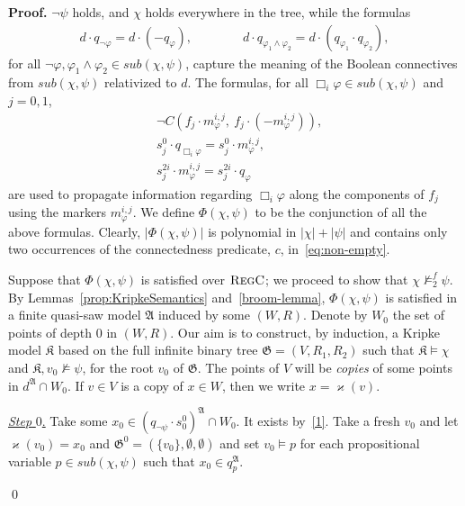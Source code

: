 \documentclass{LMCS}
\renewenvironment{proof}{\par\noindent\textbf{Proof.}}{\mbox{}\qed\par\medskip}
\theoremstyle{plain}
\newcommand{\Regc}{\textsc{RegC}}
\begin{document}
\begin{proof}
$\neg \psi$ holds,
and $\chi$ holds everywhere in the tree, while the
formulas
\begin{align}\label{2}
d \cdot q_{\neg \varphi}  = d \cdot (-q_{\varphi}),\qquad\qquad
d \cdot q_{\varphi_1 \land \varphi_2}  =  d \cdot  (q_{\varphi_1} \cdot q_{\varphi_2}),
\end{align}
for all $\neg \varphi, \varphi_1\land\varphi_2 \in \textit{sub}(\chi,\psi)$, capture the meaning of the Boolean connectives from $\textit{sub}(\chi,\psi)$ relativized to $d$. The formulas, for all $\Box_{i}\varphi \in \textit{sub}(\chi,\psi)$ and $j= 0,1$,
\begin{align}
\label{5}& \neg C(f_j \cdot m_{\varphi}^{i,j},\ f_j \cdot (-m_{\varphi}^{i,j})),\\
\label{4}& s^0_j \cdot q_{\Box_i \varphi} = s^0_j \cdot m_{\varphi}^{i,j},\\
\label{4b}
& s_j^{2i} \cdot m_{\varphi}^{i,j} =  s_j^{2i} \cdot q_{\varphi}\end{align}
are used to propagate information regarding $\Box_{i}\varphi$ along the components of $f_j$ using the markers $m_{\varphi}^{i,j}$. We define $\Phi(\chi,\psi)$ to be the conjunction of all the above
formulas.  Clearly, $|\Phi(\chi,\psi)|$ is polynomial in $|\chi| +
|\psi|$ and contains only two occurrences of the connectedness
predicate, $c$, in~\eqref{eq:non-empty}.

\bigskip

Suppose that $\Phi(\chi,\psi)$ is satisfied over
$\Regc$; we proceed to show that $\chi \not\models^f_2 \psi$.
By Lemmas~\ref{prop:KripkeSemantics} and~\ref{broom-lemma}, $\Phi(\chi,\psi)$ is satisfied in
a finite quasi-saw model $\mathfrak A$ induced by some $(W,R)$. Denote by $W_0$ the set of points of
depth $0$ in $(W,R)$. Our
aim is to construct, by induction, a Kripke model $\mathfrak K$ based
on the full infinite binary tree $\mathfrak G = (V,R_1,R_2)$ such that
$\mathfrak K \models \chi$ and $\mathfrak K,v_0 \not\models \psi$, for
the root $v_0$ of $\mathfrak G$. The points of $V$ will be
\emph{copies} of some points in $d^{\mathfrak A}\cap W_0$. If $v\in V$ is a copy of $x\in W$, then we write $x =
\varkappa(v)$.

\underline{\emph{Step} $0$.} Take some $x_0 \in
(q_{\neg\psi} \cdot s^0_0)^{\mathfrak A} \cap W_0$. It exists by~\eqref{1}. Take a fresh $v_0$ and let $\varkappa(v_0)=x_0$ and $\mathfrak G^0
=(\{v_0\},\emptyset,\emptyset)$ and set $v_0\models p$ for each
propositional variable $p \in \textit{sub}(\chi,\psi)$ such that
$x_0 \in q_p^{\mathfrak A}$.


\end{proof}
\end{document}
